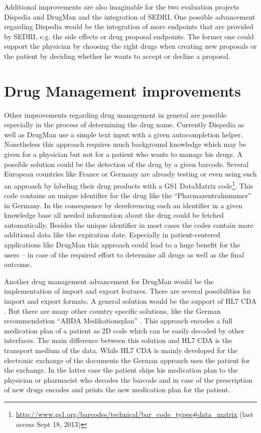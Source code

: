 Additional improvements are also imaginable for the two evaluation projects Dispedia and DrugMan and the integration of SEDRI.
One possible advancement regarding Dispedia would be the integration of more endpoints that are provided by SEDRI, e.g. the side effects or drug proposal endpoints.
The former one could support the physician by choosing the right drugs when creating new proposals or the patient by deciding whether he wants to accept or decline a proposal.

\section*{Drug Management improvements}
\label{sec:drug-manag-impr}

Other improvements regarding drug management in general are possible especially in the process of determining the drug name.
Currently Dispedia as well as DrugMan use a simple text input with a given autocompletion helper.
Nonetheless this approach requires much background knowledge which may be given for a physician but not for a patient who wants to manage his drugs.
A possible solution could be the detection of the drug by a given barcode.
Several European countries like France or Germany are already testing or even using such an approach by labeling their drug products with a GS1 DataMatrix code\footnote{\url{http://www.gs1.org/barcodes/technical/bar_code_types\#data_matrix} (last access Sept 18, 2013)}.
This code contains an unique identifier for the drug like the ``Pharmazentralnummer'' in Germany.
In the consequence by dereferencing such an identifier in a given knowledge base all needed information about the drug could be fetched automatically.
Besides the unique identifier in most cases the codes contain more additional data like the expiration date.
Especially in patient-centered applications like DrugMan this approach could lead to a huge benefit for the users -- in case of the required effort to determine all drugs as well as the final outcome.

Another drug management advancement for DrugMan would be the implementation of import and export features.
There are several possibilities for import and export formats.
A general solution would be the support of HL7 CDA \cite{dolin2001hl7}.
But there are many other country specific solutions, like the German recommendation ``ABDA Medikationsplan'' \cite{abdamedplan}.
This approach encodes a full medication plan of a patient as 2D code which can be easily decoded by other interfaces.
The main difference between this solution and HL7 CDA is the transport medium of the data.
While HL7 CDA is mainly developed for the electronic exchange of the documents the German approach uses the patient for the exchange.
In the latter case the patient ships his medication plan to the physician or pharmacist who decodes the barcode and in case of the prescription of new drugs encodes and prints the new medication plan for the patient.

